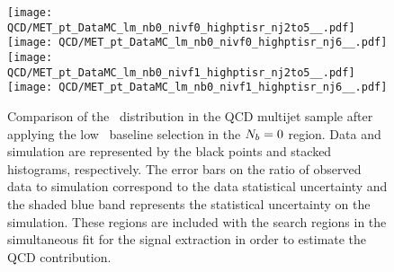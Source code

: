 \begin{figure}[!htb]
	\begin{center}
  \texttt{[image: QCD/MET\_pt\_DataMC\_lm\_nb0\_nivf0\_highptisr\_nj2to5\_\_.pdf]}
  \texttt{[image: QCD/MET\_pt\_DataMC\_lm\_nb0\_nivf0\_highptisr\_nj6\_\_.pdf]} \\
  \texttt{[image: QCD/MET\_pt\_DataMC\_lm\_nb0\_nivf1\_highptisr\_nj2to5\_\_.pdf]}
  \texttt{[image: QCD/MET\_pt\_DataMC\_lm\_nb0\_nivf1\_highptisr\_nj6\_\_.pdf]} \\
	\end{center}
	\caption[QCD Multijet LM Control Region $\nb=0$]{Comparison of the \met~distribution in the QCD multijet sample after applying the low \dm~baseline selection in the $\nb=0$ region. Data and simulation are represented by the black points and stacked histograms, respectively. The error bars on the ratio of observed data to simulation correspond to the data statistical uncertainty and the shaded blue band represents the statistical uncertainty on the simulation. These regions are included with the search regions in the simultaneous fit for the signal extraction in order to estimate the QCD contribution.
	 }
	\label{fig:qcd-cr-datavsmc-lm-nb0}
\end{figure}
